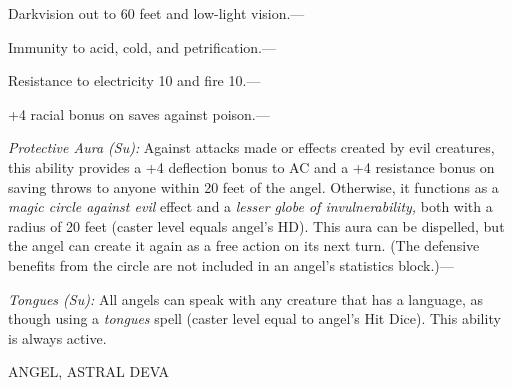 \documentclass{article}
\begin{document}
Darkvision out to 60 feet and low-light vision.---

Immunity to acid, cold, and petrification.---

Resistance to electricity 10 and fire 10.--- 

\parindent=3pt
+4 racial bonus on saves against poison.---

\parindent=0pt
\textit{Protective Aura (Su): }Against attacks made or effects created by evil 
creatures, this ability provides a +4 deflection bonus to AC and a +4 resistance 
bonus on saving throws to anyone within 20 feet of the angel. Otherwise, it functions 
as a \textit{magic circle against evil }effect and a \textit{lesser globe of invulnerability, 
}both with a radius of 20 feet (caster level equals angel's HD). This aura can 
be dispelled, but the angel can create it again as a free action on its next turn. 
(The defensive benefits from the circle are not included in an angel's statistics 
block.)---

\textit{Tongues (Su): }All angels can speak with any creature that has a language, 
as though using a \textit{tongues }spell (caster level equal to angel's Hit Dice). 
This ability is always active.

\vspace{12pt}
ANGEL, ASTRAL DEVA
\end{document}
